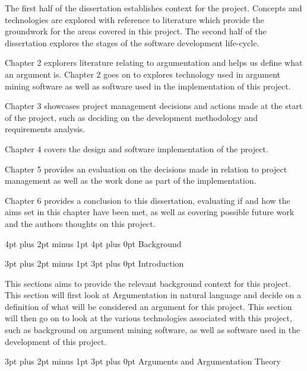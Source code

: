 \documentclass[12pt,a4paper]{article}
\makeatletter
\renewcommand\subsection{\@startsection {subsection}{1}{2mm} %
                               {3pt plus 2pt minus 1pt} %
                               {3pt plus 0pt} %
                               {\normalfont\bfseries}}
\renewcommand\section{\@startsection {section}{1}{0mm} %
                               {4pt plus 2pt minus 1pt} %
                               {4pt plus 0pt} %
                               {\bfseries}}
\makeatother
\begin{document}
The first half of the dissertation establishes context for the project. Concepts and technologies are explored with reference to literature which provide the groundwork for the areas covered in this project. The second half of the dissertation explores the stages of the software development life-cycle.

Chapter 2 explorers literature relating to argumentation and helps us define what an argument is. Chapter 2 goes on to explores technology used in argument mining software as well as software used in the implementation of this project.

Chapter 3 showcases project management decisions and actions made at the start of the project, such as deciding on the development methodology and requirements analysis.

Chapter 4 covers the design and software implementation of the project.

Chapter 5 provides an evaluation on the decisions made in relation to project management as well as the work done as part of the implementation.

Chapter 6 provides a conclusion to this dissertation, evaluating if and how the aims set in this chapter have been met, as well as covering possible future work and the authors thoughts on this project.

\newpage


\section{Background}

\subsection{Introduction}

This sections aims to provide the relevant background context for this project. This section will first look at Argumentation in natural language and decide on a definition of what will be considered an argument for this project. This section will then go on to look at the various technologies associated with this project, such as background on argument mining software, as well as software used in the development of this project.

\subsection{Arguments and Argumentation Theory}
\end{document}
